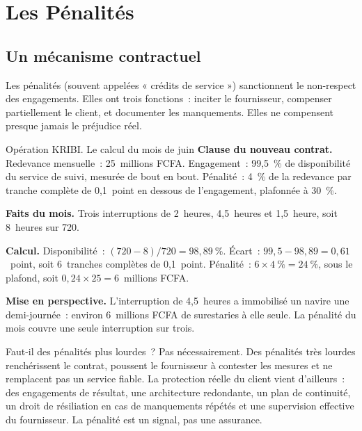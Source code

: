 \section{Les Pénalités}
\label{sec:c15-penalites}

\subsection{Un mécanisme contractuel}

Les pénalités (souvent appelées « crédits de service ») sanctionnent le
non-respect des engagements. Elles ont trois fonctions~: inciter le
fournisseur, compenser partiellement le client, et documenter les
manquements. Elles ne compensent presque jamais le préjudice réel.

\begin{boxscenario}{Opération KRIBI. Le calcul du mois de juin}
\textbf{Clause du nouveau contrat.} Redevance mensuelle~: 25~millions
FCFA. Engagement~: 99,5~\% de disponibilité du service de suivi, mesurée
de bout en bout. Pénalité~: 4~\% de la redevance par tranche complète de
0,1~point en dessous de l'engagement, plafonnée à 30~\%.

\medskip
\textbf{Faits du mois.} Trois interruptions de 2~heures, 4,5~heures et
1,5~heure, soit 8~heures sur 720.

\medskip
\textbf{Calcul.} Disponibilité~: $(720-8)/720 = 98{,}89~\%$. Écart~: $99{,}5
- 98{,}89 = 0{,}61$~point, soit 6~tranches complètes de 0,1~point.
Pénalité~: $6 \times 4~\% = 24~\%$, sous le plafond, soit $0{,}24 \times 25 =
6$~millions FCFA.

\medskip
\textbf{Mise en perspective.} L'interruption de 4,5~heures a immobilisé
un navire une demi-journée~: environ 6~millions FCFA de surestaries à elle
seule. La pénalité du mois couvre une seule interruption sur trois.
\end{boxscenario}

\begin{boiteRemarque}{Faut-il des pénalités plus lourdes~?}
Pas nécessairement. Des pénalités très lourdes renchérissent le contrat,
poussent le fournisseur à contester les mesures et ne remplacent pas un
service fiable. La protection réelle du client vient d'ailleurs~: des
engagements de résultat, une architecture redondante, un plan de
continuité, un droit de résiliation en cas de manquements répétés et une
supervision effective du fournisseur. La pénalité est un signal, pas une
assurance.
\end{boiteRemarque}

